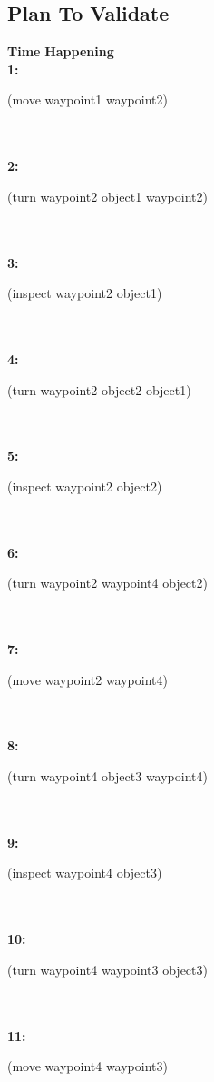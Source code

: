 \documentclass[a4paper,12pt]{article}
\newcommand{\headingtimehappening}{{\bf Time} \qquad \= {\bf Happening}\\[0.8ex]}
\newcommand{\atime}[1]{{\bf #1:}}
\newcommand{\action}[1]{{\sf #1}}
\newcommand{\listrow}[1]{\begin{minipage}[t]{11.5cm} #1 \end{minipage}}
\begin{document}
\subsection{Plan To Validate}
\begin{tabbing}
\headingtimehappening 
\atime{1}  \> \listrow{\action{(move waypoint1 waypoint2)}}\\
\\\atime{2}  \> \listrow{\action{(turn waypoint2 object1 waypoint2)}}\\
\\\atime{3}  \> \listrow{\action{(inspect waypoint2 object1)}}\\
\\\atime{4}  \> \listrow{\action{(turn waypoint2 object2 object1)}}\\
\\\atime{5}  \> \listrow{\action{(inspect waypoint2 object2)}}\\
\\\atime{6}  \> \listrow{\action{(turn waypoint2 waypoint4 object2)}}\\
\\\atime{7}  \> \listrow{\action{(move waypoint2 waypoint4)}}\\
\\\atime{8}  \> \listrow{\action{(turn waypoint4 object3 waypoint4)}}\\
\\\atime{9}  \> \listrow{\action{(inspect waypoint4 object3)}}\\
\\\atime{10}  \> \listrow{\action{(turn waypoint4 waypoint3 object3)}}\\
\\\atime{11}  \> \listrow{\action{(move waypoint4 waypoint3)}}\\
\end{tabbing}
\end{document}
